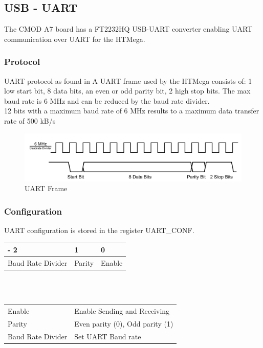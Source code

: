 \subsection{USB - UART}
The CMOD A7 board has a FT2232HQ USB-UART converter enabling UART communication over UART for the HTMega.

\subsubsection{Protocol}
UART protocol as found in \cite{uart}
A UART frame used by the HTMega consists of: 1 low start bit, 8 data bits, an even or odd parity bit, 2 high stop bits.
The max baud rate is 6 MHz and can be reduced by the baud rate divider.\\
12 bits with a maximum baud rate of 6 MHz results to a maximum data transfer rate of 500 kB/s 
\begin{figure}[h]
    \begin{center}
        \includegraphics[scale=0.2]{assets/UART.png}
    \end{center} 
    \caption{UART Frame}
\end{figure}
\newpage


\subsubsection{Configuration}
UART configuration is stored in the register UART\_CONF.\\

\begin{tabular}{|P{120mm}|P{15mm}|P{15mm}|}
     - 2 & 1 & 0\\
    \hline
    Baud Rate Divider & Parity & Enable \\
    \hline
\end{tabular}\\~\\

\begin{tabular}{@{}p{35mm}|p{60mm}}
    Enable & Enable Sending and Receiving\\
    Parity & Even parity (0), Odd parity (1)\\ 
    Baud Rate Divider & Set UART Baud rate
\end{tabular}

